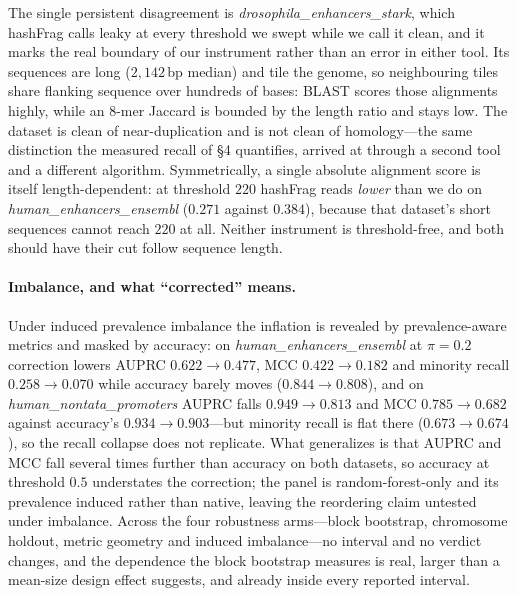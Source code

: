 \documentclass[11pt,a4paper]{article}
\begin{document}
The single persistent disagreement is \textit{drosophila\_enhancers\_stark}, which hashFrag calls leaky at every threshold we swept while we call it clean, and it marks the real boundary of our instrument rather than an error in either tool. Its sequences are long ($2{,}142$\,bp median) and tile the genome, so neighbouring tiles share flanking sequence over hundreds of bases: BLAST scores those alignments highly, while an $8$-mer Jaccard is bounded by the length ratio and stays low. The dataset is clean of near-duplication and is not clean of homology---the same distinction the measured recall of \S4 quantifies, arrived at through a second tool and a different algorithm. Symmetrically, a single absolute alignment score is itself length-dependent: at threshold $220$ hashFrag reads \emph{lower} than we do on \textit{human\_enhancers\_ensembl} ($0.271$ against $0.384$), because that dataset's short sequences cannot reach $220$ at all. Neither instrument is threshold-free, and both should have their cut follow sequence length.

\paragraph{Imbalance, and what ``corrected'' means.} Under induced prevalence imbalance the inflation is revealed by prevalence-aware metrics and masked by accuracy: on \textit{human\_enhancers\_ensembl} at $\pi=0.2$ correction lowers AUPRC $0.622\to0.477$, MCC $0.422\to0.182$ and minority recall $0.258\to0.070$ while accuracy barely moves ($0.844\to0.808$), and on \textit{human\_nontata\_promoters} AUPRC falls $0.949\to0.813$ and MCC $0.785\to0.682$ against accuracy's $0.934\to0.903$---but minority recall is flat there ($0.673\to0.674$), so the recall collapse does not replicate. What generalizes is that AUPRC and MCC fall several times further than accuracy on both datasets, so accuracy at threshold $0.5$ understates the correction; the panel is random-forest-only and its prevalence induced rather than native, leaving the reordering claim untested under imbalance. Across the four robustness arms---block bootstrap, chromosome holdout, metric geometry and induced imbalance---no interval and no verdict changes, and the dependence the block bootstrap measures is real, larger than a mean-size design effect suggests, and already inside every reported interval.
\end{document}
